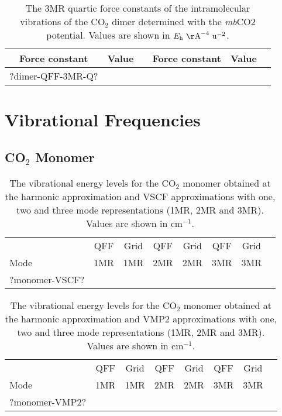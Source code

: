 \documentclass[aip,jcp,showpacs,superscriptaddress,groupedaddress]{revtex4-1}  %
\begin{document}
\begin{table}[H]
\centering
\caption{The 3MR quartic force constants of the intramolecular vibrations of the CO$_2$ dimer determined with the \emph{mb}CO2 potential. Values are shown in $E_{\rm h}\ {\rm \AA}^{-4}\ {\rm u}^{-2}$.}
\label{table:qff_dimer-3mr-q}
\begin{ruledtabular}
\begin{tabular}{cccccc}
Force constant & Value      &  & Force constant & Value      &    \\
\hline \Tstrut
?dimer-QFF-3MR-Q?
\end{tabular}
\end{ruledtabular}
\end{table}

\section[S2]{\label{sec:vibrations}Vibrational Frequencies}

\subsection{\label{sec:monomer-freq}CO$_2$ Monomer}

\begin{table}[H]
\caption{The vibrational energy levels for the CO$_2$ monomer obtained at the harmonic approximation and VSCF approximations with one, two and three mode representations (1MR, 2MR and 3MR). Values are shown in cm$^{-1}$.}
\begin{ruledtabular}
\begin{tabular}{lccccccc}
    & QFF &  Grid & QFF & Grid & QFF & Grid   \\  
  Mode & 1MR & 1MR & 2MR & 2MR & 3MR & 3MR   \\ 
\hline \Tstrut
?monomer-VSCF?
\end{tabular}
\end{ruledtabular}
\label{table:monomer-vscf}
\end{table}  

\begin{table}[h]
\caption{The vibrational energy levels for the CO$_2$ monomer obtained at the harmonic approximation and VMP2 approximations with one, two and three mode representations (1MR, 2MR and 3MR). Values are shown in cm$^{-1}$.}
\begin{ruledtabular}
\begin{tabular}{lccccccc}
    & QFF &  Grid & QFF & Grid & QFF & Grid   \\  
  Mode & 1MR & 1MR & 2MR & 2MR & 3MR & 3MR   \\ 
\hline \Tstrut
?monomer-VMP2?
\end{tabular}
\end{ruledtabular}
\label{table:monomer-vmp2}
\end{table}
\end{document}
